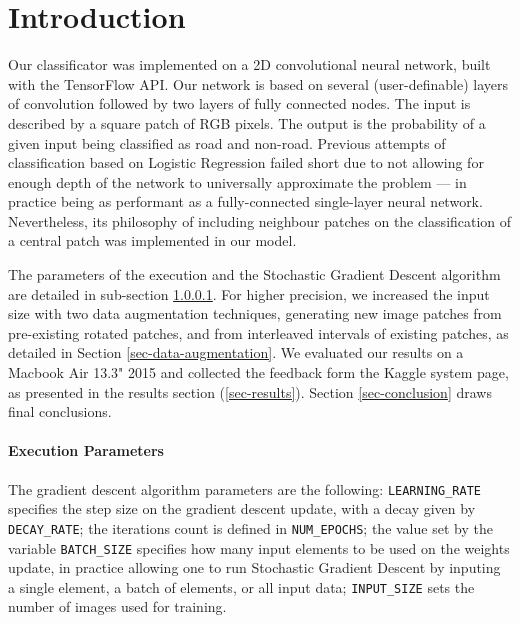 \documentclass[fleqn,9 pt]{SelfArx} %
\affiliation{\textbf{Email (SCIPER):} \hspace{0.2cm} \textsuperscript{1} bruno.magalhaes@epfl.ch (212079) \hspace{0.2cm} \textsuperscript{2} riccardo.silini@epfl.ch (214398) \hspace{0.2cm}}
\begin{document}
\begin{sloppypar} %

\flushbottom %
\maketitle %

\section{Introduction}

Our classificator was implemented on a 2D convolutional neural network, built with the TensorFlow API. Our network is based on several (user-definable) layers of convolution followed by two layers of fully connected nodes. The input is described by a square patch of RGB pixels. The output is the probability of a given input being classified as road and non-road.
Previous attempts of classification based on Logistic Regression failed short due to not allowing for enough depth of the network to universally approximate the problem --- in practice being as performant as a fully-connected single-layer neural network. Nevertheless, its philosophy of including neighbour patches on the classification of a central patch was implemented in our model.

The parameters of the execution and the Stochastic Gradient Descent algorithm are detailed in sub-section \ref{sec-execution-parameters}. For higher precision, we increased the input size with two data augmentation techniques, generating new image patches from pre-existing rotated patches, and from interleaved intervals of existing patches, as detailed in Section \ref{sec-data-augmentation}. We evaluated our results on a Macbook Air 13.3" 2015 and collected the feedback form the Kaggle system page, as presented in the results section (\ref{sec-results}). Section \ref{sec-conclusion} draws final conclusions.

\paragraph{Execution Parameters}
\label{sec-execution-parameters}

The gradient descent algorithm parameters are the following: \texttt{LEARNING\_RATE} specifies the step size on the gradient descent update, with a decay given by \texttt{DECAY\_RATE}; the iterations count is defined in \texttt{NUM\_EPOCHS}; the value set by the variable \texttt{BATCH\_SIZE} specifies how many input elements to be used on the weights update, in practice allowing one to run Stochastic Gradient Descent by inputing a single element, a batch of elements, or all input data; \texttt{INPUT\_SIZE} sets the number of images used for training.


\end{sloppypar}
\end{document}
